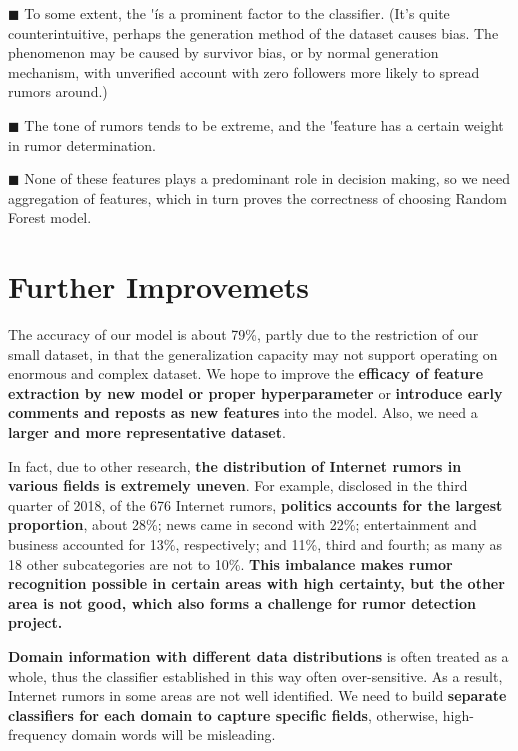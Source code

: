 \documentclass[12pt,a4paper]{article}
\begin{document}
 \setlength{\hangindent}{4em}
$\blacksquare$ To some extent, the \'\' is a prominent factor to the classifier. (It’s quite counterintuitive, perhaps the generation method of the dataset causes bias. The phenomenon may be caused by survivor bias, or by normal generation mechanism, with unverified account with zero followers more likely to spread rumors around.)

 \setlength{\hangindent}{4em}
$\blacksquare$ The tone of rumors tends to be extreme, and the \'\' feature has a certain weight in rumor determination. 

 \setlength{\hangindent}{4em}
$\blacksquare$ None of these features plays a predominant role in decision making, so we need aggregation of features, which in turn proves the correctness of choosing Random Forest model. 
\vspace{-15pt}
\section{Further Improvemets}
The accuracy of our model is about 79\%, partly due to the restriction of our small dataset, in that the generalization capacity may not support operating on enormous and complex dataset. We hope to improve the \textbf{efficacy of feature extraction by new model or proper hyperparameter} or \textbf{introduce early comments and reposts as new features} into the model. Also, we need a \textbf{larger and more representative dataset}.

In fact, due to other research, \textbf{the distribution of Internet rumors in various fields is extremely uneven}. For example, disclosed in the third quarter of 2018, of the 676 Internet rumors, \textbf{politics accounts for the largest proportion}, about 28\%; news came in second with 22\%; entertainment and business accounted for 13\%, respectively; and 11\%, third and fourth; as many as 18 other subcategories are not to 10\%. \textbf{This imbalance makes rumor recognition possible in certain areas with high certainty, but the other area is not good, which also forms a challenge for rumor detection project.}

\textbf{Domain information with different data distributions} is often treated as a whole, thus the classifier established in this way often over-sensitive. As a result, Internet rumors in some areas are not well identified. We need to build \textbf{separate classifiers for each domain to capture specific fields}, otherwise, high-frequency domain words will be misleading. 
\end{document}
